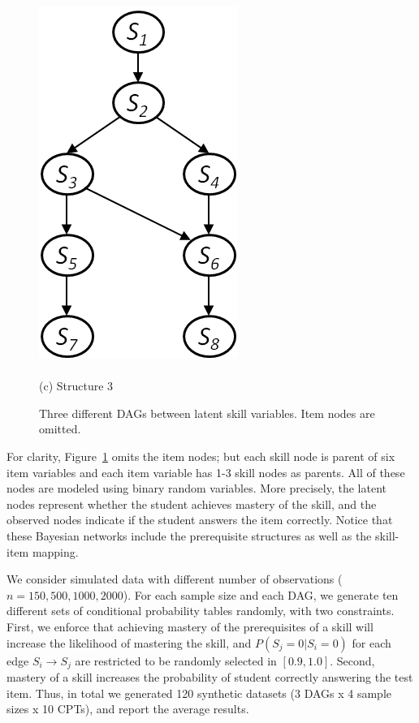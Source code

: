 \documentclass{edm_template}
\begin{document}
\begin{figure}[!ht]
\begin{minipage}[b]{0.45\linewidth}
			\includegraphics[width=0.7\linewidth]{figures/model3.png}\\~\\
			(c) Structure 3
		\end{minipage}	
		\caption{Three different DAGs between latent skill variables.  Item nodes are omitted.}
		\label{fig:syn-nets}
		\vspace{-1em}
	\end{figure} 
	
	For clarity, Figure~\ref{fig:syn-nets}  omits the item nodes;
	but each skill node is parent of six item variables and each item variable has 1-3 skill nodes as parents.
	All of these nodes are modeled using binary random variables.
	More precisely, the latent  nodes represent whether the student  achieves mastery of the skill,
	and the observed nodes indicate if the student answers the item correctly.
	Notice that these Bayesian networks include the prerequisite structures as well as the skill-item mapping.
	
	We consider simulated data with different number of observations ($n=150, 500, 1000, 2000$).
	For each sample size and each  DAG, we generate ten different sets of conditional probability tables
	randomly, with two constraints.
	First, we enforce that achieving mastery of the prerequisites of a skill will increase the likelihood of mastering the skill,
	and $P(S_j=0|S_i=0)$ for each edge $S_i\rightarrow S_j$ are restricted to be randomly selected in $[0.9, 1.0]$.
	Second, mastery of a skill increases the probability of student correctly answering the test item. 
	Thus, in total we generated 120 synthetic datasets (3 DAGs x 4 sample sizes x 10 CPTs), and  report the average results.
	
\end{document}
